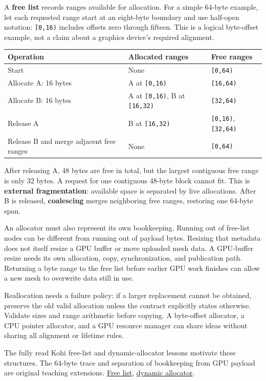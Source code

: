 A \textbf{free list} records ranges available for allocation. For a simple 64-byte example, let each requested range start at an eight-byte boundary and use half-open notation: \texttt{{[}0,16)} includes offsets zero through fifteen. This is a logical byte-offset example, not a claim about a graphics device's required alignment.

{\def\LTcaptype{none} %
\begin{longtable}[]{@{}lll@{}}
\toprule\noalign{}
Operation & Allocated ranges & Free ranges \\
\midrule\noalign{}
\endhead
\bottomrule\noalign{}
\endlastfoot
Start & None & \texttt{{[}0,64)} \\
Allocate A: 16 bytes & A at \texttt{{[}0,16)} & \texttt{{[}16,64)} \\
Allocate B: 16 bytes & A at \texttt{{[}0,16)}, B at \texttt{{[}16,32)} & \texttt{{[}32,64)} \\
Release A & B at \texttt{{[}16,32)} & \texttt{{[}0,16)}, \texttt{{[}32,64)} \\
Release B and merge adjacent free ranges & None & \texttt{{[}0,64)} \\
\end{longtable}
}

After releasing A, 48 bytes are free in total, but the largest contiguous free range is only 32 bytes. A request for one contiguous 48-byte block cannot fit. This is \textbf{external fragmentation}: available space is separated by live allocations. After B is released, \textbf{coalescing} merges neighboring free ranges, restoring one 64-byte span.

An allocator must also represent its own bookkeeping. Running out of free-list nodes can be different from running out of payload bytes. Resizing that metadata does not itself resize a GPU buffer or move uploaded mesh data. A GPU-buffer resize needs its own allocation, copy, synchronization, and publication path. Returning a byte range to the free list before earlier GPU work finishes can allow a new mesh to overwrite data still in use.

Reallocation needs a failure policy: if a larger replacement cannot be obtained, preserve the old valid allocation unless the contract explicitly states otherwise. Validate sizes and range arithmetic before copying. A byte-offset allocator, a CPU pointer allocator, and a GPU resource manager can share ideas without sharing all alignment or lifetime rules.

The fully read Kohi free-list and dynamic-allocator lessons motivate these structures. The 64-byte trace and separation of bookkeeping from GPU payload are original teaching extensions. \href{https://www.youtube.com/watch?v=sP7xRUyP3e0}{Free list}, \href{https://www.youtube.com/watch?v=BSBFBWwG8Ds}{dynamic allocator}.

